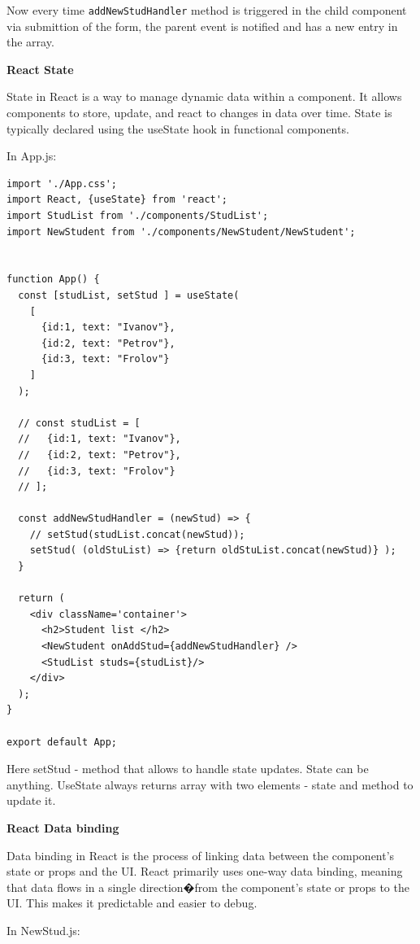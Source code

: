 Now every time \verb"addNewStudHandler" method is triggered in the child component via submittion of the form, the parent event is notified and has a new entry in the array.


\medskip
\textbf{React State}

State in React is a way to manage dynamic data within a component. It allows components to store, update, and react to changes in data over time. State is typically declared using the useState hook in functional components.

In App.js:

\begin{lstlisting}
import './App.css';
import React, {useState} from 'react';
import StudList from './components/StudList';
import NewStudent from './components/NewStudent/NewStudent';


function App() {
  const [studList, setStud ] = useState(
    [
      {id:1, text: "Ivanov"},
      {id:2, text: "Petrov"},
      {id:3, text: "Frolov"}
    ]
  );

  // const studList = [
  //   {id:1, text: "Ivanov"},
  //   {id:2, text: "Petrov"},
  //   {id:3, text: "Frolov"}
  // ];

  const addNewStudHandler = (newStud) => {
    // setStud(studList.concat(newStud));
    setStud( (oldStuList) => {return oldStuList.concat(newStud)} );
  }

  return (
    <div className='container'>
      <h2>Student list </h2>
      <NewStudent onAddStud={addNewStudHandler} />
      <StudList studs={studList}/>
    </div>
  );
}

export default App;
\end{lstlisting}

Here setStud - method that allows to handle state updates. State can be anything. UseState always returns array with two elements - state and method to update it.



\medskip
\textbf{React Data binding}

Data binding in React is the process of linking data between the component's state or props and the UI. React primarily uses one-way data binding, meaning that data flows in a single direction�from the component's state or props to the UI. This makes it predictable and easier to debug.

In NewStud.js:

